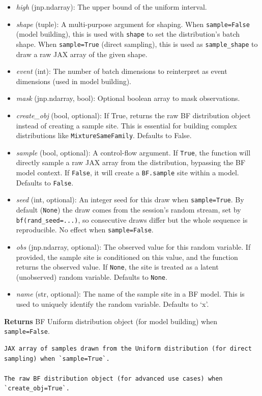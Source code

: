 \documentclass[
  letterpaper,
  DIV=11,
  numbers=noendperiod]{scrartcl}
\begin{document}
\begin{itemize}
\item
  \emph{high} (jnp.ndarray): The upper bound of the uniform interval.
\item
  \emph{shape} (tuple): A multi-purpose argument for shaping. When
  \texttt{sample=False} (model building), this is used with
  \texttt{shape} to set the distribution's batch shape. When
  \texttt{sample=True} (direct sampling), this is used as
  \texttt{sample\_shape} to draw a raw JAX array of the given shape.
\item
  \emph{event} (int): The number of batch dimensions to reinterpret as
  event dimensions (used in model building).
\item
  \emph{mask} (jnp.ndarray, bool): Optional boolean array to mask
  observations.
\item
  \emph{create\_obj} (bool, optional): If True, returns the raw BF
  distribution object instead of creating a sample site. This is
  essential for building complex distributions like
  \texttt{MixtureSameFamily}. Defaults to False.
\item
  \emph{sample} (bool, optional): A control-flow argument. If
  \texttt{True}, the function will directly sample a raw JAX array from
  the distribution, bypassing the BF model context. If \texttt{False},
  it will create a \texttt{BF.sample} site within a model. Defaults to
  \texttt{False}.
\item
  \emph{seed} (int, optional): An integer seed for this draw when
  \texttt{sample=True}. By default (\texttt{None}) the draw comes from
  the session's random stream, set by \texttt{bf(rand\_seed=...)}, so
  consecutive draws differ but the whole sequence is reproducible. No
  effect when \texttt{sample=False}.
\item
  \emph{obs} (jnp.ndarray, optional): The observed value for this random
  variable. If provided, the sample site is conditioned on this value,
  and the function returns the observed value. If \texttt{None}, the
  site is treated as a latent (unobserved) random variable. Defaults to
  \texttt{None}.
\item
  \emph{name} (str, optional): The name of the sample site in a BF
  model. This is used to uniquely identify the random variable. Defaults
  to `x'.
\end{itemize}

\textbf{Returns} BF Uniform distribution object (for model building)
when \texttt{sample=False}.

\begin{verbatim}
JAX array of samples drawn from the Uniform distribution (for direct
sampling) when `sample=True`.

The raw BF distribution object (for advanced use cases) when
`create_obj=True`.
\end{verbatim}
\end{document}
